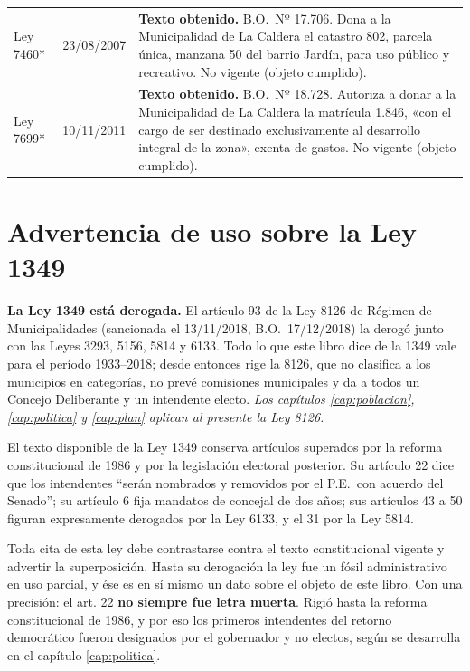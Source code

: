 \begin{longtable}{@{}p{3.2cm}p{1.9cm}p{7.9cm}@{}}
Ley 7460* & 23/08/2007 & \textbf{Texto obtenido.} B.O.\ Nº 17.706. Dona a la Municipalidad de La Caldera el catastro 802, parcela única, manzana 50 del barrio Jardín, para uso público y recreativo. No vigente (objeto cumplido). \\
Ley 7699* & 10/11/2011 & \textbf{Texto obtenido.} B.O.\ Nº 18.728. Autoriza a donar a la Municipalidad de La Caldera la matrícula 1.846, «con el cargo de ser destinado exclusivamente al desarrollo integral de la zona», exenta de gastos. No vigente (objeto cumplido). \\
\bottomrule
\end{longtable}

\section*{Advertencia de uso sobre la Ley 1349}

\begin{cautela}
\textbf{La Ley 1349 está derogada.} El artículo 93 de la Ley 8126 de Régimen de Municipalidades (sancionada el 13/11/2018, B.O.\ 17/12/2018) la derogó junto con las Leyes 3293, 5156, 5814 y 6133. Todo lo que este libro dice de la 1349 vale para el período 1933--2018; desde entonces rige la 8126, que no clasifica a los municipios en categorías, no prevé comisiones municipales y da a todos un Concejo Deliberante y un intendente electo. \textit{Los capítulos \ref{cap:poblacion}, \ref{cap:politica} y \ref{cap:plan} aplican al presente la Ley 8126.}

El texto disponible de la Ley 1349 conserva artículos superados por la reforma constitucional de 1986 y por la legislación electoral posterior. Su artículo 22 dice que los intendentes ``serán nombrados y removidos por el P.E.\ con acuerdo del Senado''; su artículo 6 fija mandatos de concejal de dos años; sus artículos 43 a 50 figuran expresamente derogados por la Ley 6133, y el 31 por la Ley 5814.

Toda cita de esta ley debe contrastarse contra el texto constitucional vigente y advertir la superposición. Hasta su derogación la ley fue un fósil administrativo en uso parcial, y ése es en sí mismo un dato sobre el objeto de este libro. Con una precisión: el art. 22 \textbf{no siempre fue letra muerta}. Rigió hasta la reforma constitucional de 1986, y por eso los primeros intendentes del retorno democrático fueron designados por el gobernador y no electos, según se desarrolla en el capítulo \ref{cap:politica}.
\end{cautela}

